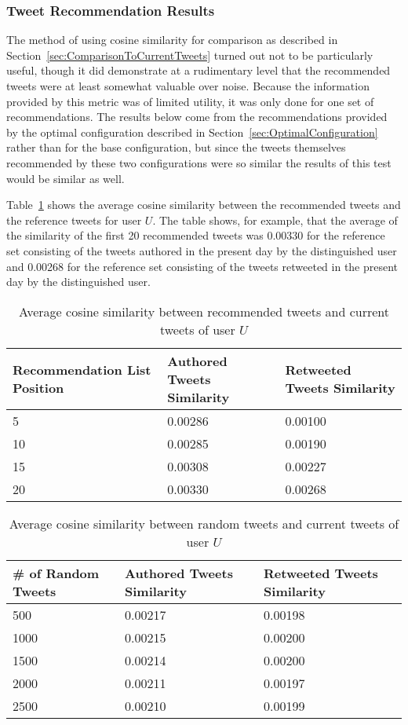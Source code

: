 \subsubsection{Tweet Recommendation Results}

The method of using cosine similarity for comparison as described in Section~\ref{sec:ComparisonToCurrentTweets} turned out not to be particularly useful, though it did demonstrate at a rudimentary level that the recommended tweets were at least somewhat valuable over noise. Because the information provided by this metric was of limited utility, it was only done for one set of recommendations. The results below come from the recommendations provided by the optimal configuration described in Section~\ref{sec:OptimalConfiguration} rather than for the base configuration, but since the tweets themselves recommended by these two configurations were so similar the results of this test would be similar as well.

Table~\ref{tab:RecommendedTweetSimilarity} shows the average cosine similarity between the recommended tweets and the reference tweets for user $U$. The table shows, for example, that the average of the similarity of the first 20 recommended tweets was 0.00330 for the reference set consisting of the tweets authored in the present day by the distinguished user and 0.00268 for the reference set consisting of the tweets retweeted in the present day by the distinguished user.


\begin{table}
\centering
\begin{tabular}{p{3.5cm}|p{4cm}|p{4cm}}
{\bf Recommendation List Position} & {\bf Authored Tweets Similarity} & {\bf Retweeted Tweets Similarity} \\ \hline
 5 & 0.00286 & 0.00100 \\ \hline
10 & 0.00285 & 0.00190 \\ \hline
15 & 0.00308 & 0.00227 \\ \hline
20 & 0.00330 & 0.00268 \\
\end{tabular}
\caption{Average cosine similarity between recommended tweets and current tweets of user $U$}
\label{tab:RecommendedTweetSimilarity}
\end{table}

\begin{table}
\centering
\begin{tabular}{p{3.25cm}|p{4cm}|p{4cm}}
{\bf \# of Random Tweets} & {\bf Authored Tweets Similarity} & {\bf Retweeted Tweets Similarity} \\ \hline
 500 & 0.00217 & 0.00198 \\ \hline
1000 & 0.00215  & 0.00200 \\ \hline
1500 & 0.00214 & 0.00200 \\ \hline
2000 & 0.00211 & 0.00197 \\ \hline
2500 & 0.00210 & 0.00199 \\
\end{tabular}
\caption{Average cosine similarity between random tweets and current tweets of user $U$}
\label{tab:RandomTweetSimilarity}
\end{table}


